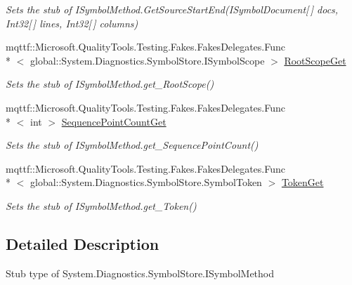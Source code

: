 \begin{DoxyCompactItemize}
\begin{DoxyCompactList}\small\item\em Sets the stub of I\-Symbol\-Method.\-Get\-Source\-Start\-End(\-I\-Symbol\-Document\mbox{[}$\,$\mbox{]} docs, Int32\mbox{[}$\,$\mbox{]} lines, Int32\mbox{[}$\,$\mbox{]} columns)\end{DoxyCompactList}\item 
mqttf\-::\-Microsoft.\-Quality\-Tools.\-Testing.\-Fakes.\-Fakes\-Delegates.\-Func\\*
$<$ global\-::\-System.\-Diagnostics.\-Symbol\-Store.\-I\-Symbol\-Scope $>$ \hyperlink{class_system_1_1_diagnostics_1_1_symbol_store_1_1_fakes_1_1_stub_i_symbol_method_a1ca217d4ef914c2881d087be4e0a3a67}{Root\-Scope\-Get}
\begin{DoxyCompactList}\small\item\em Sets the stub of I\-Symbol\-Method.\-get\-\_\-\-Root\-Scope()\end{DoxyCompactList}\item 
mqttf\-::\-Microsoft.\-Quality\-Tools.\-Testing.\-Fakes.\-Fakes\-Delegates.\-Func\\*
$<$ int $>$ \hyperlink{class_system_1_1_diagnostics_1_1_symbol_store_1_1_fakes_1_1_stub_i_symbol_method_a751104cc9d0cfb26312f9e586f133297}{Sequence\-Point\-Count\-Get}
\begin{DoxyCompactList}\small\item\em Sets the stub of I\-Symbol\-Method.\-get\-\_\-\-Sequence\-Point\-Count()\end{DoxyCompactList}\item 
mqttf\-::\-Microsoft.\-Quality\-Tools.\-Testing.\-Fakes.\-Fakes\-Delegates.\-Func\\*
$<$ global\-::\-System.\-Diagnostics.\-Symbol\-Store.\-Symbol\-Token $>$ \hyperlink{class_system_1_1_diagnostics_1_1_symbol_store_1_1_fakes_1_1_stub_i_symbol_method_ac399eaaf7ed540d71b207e6a08a47a63}{Token\-Get}
\begin{DoxyCompactList}\small\item\em Sets the stub of I\-Symbol\-Method.\-get\-\_\-\-Token()\end{DoxyCompactList}\end{DoxyCompactItemize}


\subsection{Detailed Description}
Stub type of System.\-Diagnostics.\-Symbol\-Store.\-I\-Symbol\-Method



